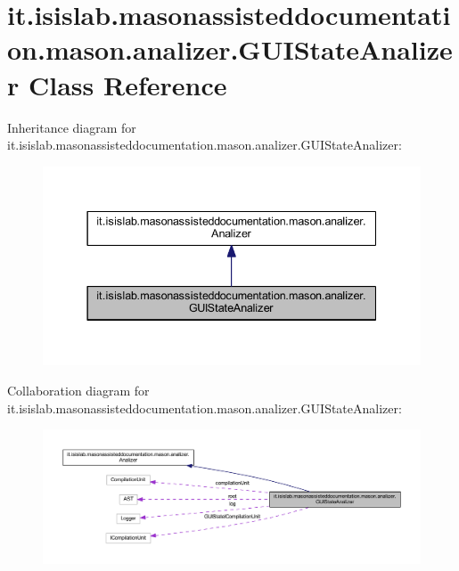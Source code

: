 \hypertarget{classit_1_1isislab_1_1masonassisteddocumentation_1_1mason_1_1analizer_1_1_g_u_i_state_analizer}{\section{it.\-isislab.\-masonassisteddocumentation.\-mason.\-analizer.\-G\-U\-I\-State\-Analizer Class Reference}
\label{classit_1_1isislab_1_1masonassisteddocumentation_1_1mason_1_1analizer_1_1_g_u_i_state_analizer}
}


Inheritance diagram for it.\-isislab.\-masonassisteddocumentation.\-mason.\-analizer.\-G\-U\-I\-State\-Analizer\-:\nopagebreak
\begin{figure}[H]
\begin{center}
\leavevmode
\includegraphics[width=337pt]{classit_1_1isislab_1_1masonassisteddocumentation_1_1mason_1_1analizer_1_1_g_u_i_state_analizer__inherit__graph}
\end{center}
\end{figure}


Collaboration diagram for it.\-isislab.\-masonassisteddocumentation.\-mason.\-analizer.\-G\-U\-I\-State\-Analizer\-:\nopagebreak
\begin{figure}[H]
\begin{center}
\leavevmode
\includegraphics[width=350pt]{classit_1_1isislab_1_1masonassisteddocumentation_1_1mason_1_1analizer_1_1_g_u_i_state_analizer__coll__graph}
\end{center}
\end{figure}
